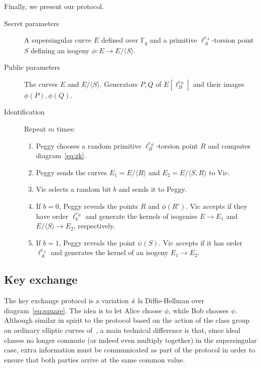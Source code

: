 \documentclass[jmc]{degruyter-journal-a}
\theoremstyle{definition}
\newcommand{\FF}{{\mathbb{F}}}
\newcommand{\cyc}[1]{{\langle #1 \rangle}}
\begin{document}
Finally, we present our protocol.

\begin{description}
\item[Secret parameters] A supersingular curve $E$ defined over
  $\FF_q$ and a primitive $\ell_A^{e_A}$-torsion point $S$ defining an
  isogeny $\phi:E\to E/\cyc{S}$.
\item[Public parameters] The curves $E$ and $E/\cyc{S}$. Generators
  $P,Q$ of $E[\ell_B^{e_B}]$ and their images $\phi(P),\phi(Q)$.
\item[Identification] Repeat $m$ times:
  \begin{enumerate}
  \item Peggy chooses a random primitive $\ell_B^{e_B}$-torsion point
    $R$ and computes diagram~\eqref{eq:zk}.
  \item Peggy sends the curves $E_1=E/\cyc{R}$ and $E_2=E/\cyc{S,R}$ to Vic.
  \item Vic selects a random bit $b$ and sends it to Peggy.
  \item If $b=0$, Peggy reveals the points $R$ and $\phi(R')$. Vic
    accepts if they have order $\ell_b^{e_B}$ and generate the kernels
    of isogenies $E\to E_1$ and $E/\cyc{S}\to E_2$, respectively.
  \item If $b=1$, Peggy reveals the point $\psi(S)$. Vic accepts if it
    has order $\ell_A^{e_A}$ and generates the kernel of an isogeny
    $E_1\to E_2$.
  \end{enumerate}
\end{description}


\subsection{Key exchange}\label{subsec:kep}

The key exchange protocol is a variation \emph{\`a la} Diffie-Hellman
over diagram~\eqref{eq:square}. The idea is to let Alice choose
$\phi$, while Bob chooses $\psi$. Although similar in spirit to the
protocol based on the action of the class group on ordinary elliptic
curves of~\cite{Stol}, a main technical difference is that, since
ideal classes no longer commute (or indeed even multiply together) in
the supersingular case, extra information must be communicated as part
of the protocol in order to ensure that both parties arrive at the
same common value.
\end{document}
